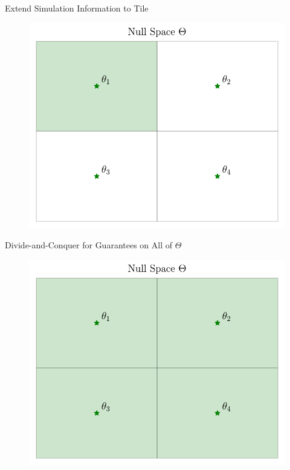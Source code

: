 \begin{frame}{Extend Simulation Information to Tile}
\begin{figure}
    \centering
    \includegraphics[width=0.95\linewidth]{figs/approach_4.pdf}
\end{figure} 
\end{frame}

\begin{frame}{Divide-and-Conquer for Guarantees on All of $\Theta$}
\begin{figure}
    \centering
    \includegraphics[width=0.95\linewidth]{figs/approach_5.pdf}
\end{figure} 
\end{frame}

